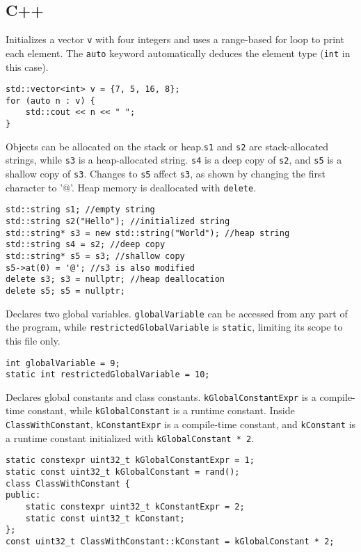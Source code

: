\subsection*{C++}
Initializes a vector \texttt{v} with four integers and uses a range-based
for loop to print each element. The \texttt{auto} keyword automatically deduces
the element type (\texttt{int} in this case).
\begin{verbatim}
std::vector<int> v = {7, 5, 16, 8};
for (auto n : v) {
    std::cout << n << " ";
}
\end{verbatim}

Objects can be allocated on the stack or heap.\texttt{s1} and \texttt{s2} are stack-allocated
strings, while \texttt{s3} is a heap-allocated string. \texttt{s4} is a deep copy of \texttt{s2},
and \texttt{s5} is a shallow copy of \texttt{s3}. Changes to \texttt{s5} affect \texttt{s3}, as
shown by changing the first character to '@'. Heap memory is deallocated with \texttt{delete}.
\begin{verbatim}
std::string s1; //empty string
std::string s2("Hello"); //initialized string
std::string* s3 = new std::string("World"); //heap string
std::string s4 = s2; //deep copy
std::string* s5 = s3; //shallow copy
s5->at(0) = '@'; //s3 is also modified
delete s3; s3 = nullptr; //heap deallocation
delete s5; s5 = nullptr; 
\end{verbatim}

Declares two global variables. \texttt{globalVariable} can be accessed from any
part of the program, while \texttt{restrictedGlobalVariable} is \texttt{static},
limiting its scope to this file only.
\begin{verbatim}
int globalVariable = 9;
static int restrictedGlobalVariable = 10;
\end{verbatim}

Declares global constants and class constants. \texttt{kGlobalConstantExpr} is a
compile-time constant, while \texttt{kGlobalConstant} is a runtime constant. Inside
\texttt{ClassWithConstant}, \texttt{kConstantExpr} is a compile-time constant, and
\texttt{kConstant} is a runtime constant initialized with \texttt{kGlobalConstant * 2}.
\begin{verbatim}
static constexpr uint32_t kGlobalConstantExpr = 1;
static const uint32_t kGlobalConstant = rand();
class ClassWithConstant {
public:
    static constexpr uint32_t kConstantExpr = 2;
    static const uint32_t kConstant;
};
const uint32_t ClassWithConstant::kConstant = kGlobalConstant * 2;
\end{verbatim}

